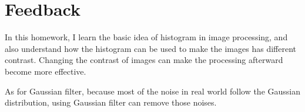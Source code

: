 \documentclass[twocolumn]{extarticle}
\begin{document}
\section{Feedback}

In this homework, I learn the basic idea of histogram in image processing, and also understand how the histogram can be used to make the images has different contrast. Changing the contrast of images can make the processing afterward become more effective. 

As for Gaussian filter, because most of the noise in real world follow the Gaussian distribution, using Gaussian filter can remove those noises.
\end{document}
